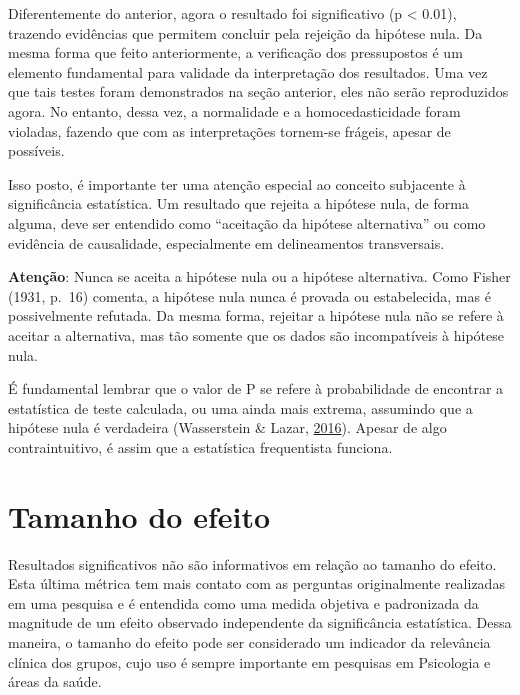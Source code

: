 \documentclass[
]{book}
\begin{document}
Diferentemente do anterior, agora o resultado foi significativo (p
\textless{} 0.01), trazendo evidências que permitem concluir pela
rejeição da hipótese nula. Da mesma forma que feito anteriormente, a
verificação dos pressupostos é um elemento fundamental para validade da
interpretação dos resultados. Uma vez que tais testes foram demonstrados
na seção anterior, eles não serão reproduzidos agora. No entanto, dessa
vez, a normalidade e a homocedasticidade foram violadas, fazendo que com
as interpretações tornem-se frágeis, apesar de possíveis.

Isso posto, é importante ter uma atenção especial ao conceito subjacente
à significância estatística. Um resultado que rejeita a hipótese nula,
de forma alguma, deve ser entendido como ``aceitação da hipótese
alternativa'' ou como evidência de causalidade, especialmente em
delineamentos transversais.

\begin{warning}

\textbf{Atenção}: Nunca se aceita a hipótese nula ou a hipótese
alternativa. Como Fisher (1931, p.~16) comenta, a hipótese nula nunca é
provada ou estabelecida, mas é possivelmente refutada. Da mesma forma,
rejeitar a hipótese nula não se refere à aceitar a alternativa, mas tão
somente que os dados são incompatíveis à hipótese nula.

\end{warning}

É fundamental lembrar que o valor de P se refere à probabilidade de
encontrar a estatística de teste calculada, ou uma ainda mais extrema,
assumindo que a hipótese nula é verdadeira (Wasserstein \& Lazar,
\protect\hyperlink{ref-Wasserstein2016}{2016}). Apesar de algo
contraintuitivo, é assim que a estatística frequentista funciona.

\hypertarget{tamanho-do-efeito-1}{%
\section{Tamanho do efeito}\label{tamanho-do-efeito-1}}

Resultados significativos não são informativos em relação ao tamanho do
efeito. Esta última métrica tem mais contato com as perguntas
originalmente realizadas em uma pesquisa e é entendida como uma medida
objetiva e padronizada da magnitude de um efeito observado independente
da significância estatística. Dessa maneira, o tamanho do efeito pode
ser considerado um indicador da relevância clínica dos grupos, cujo uso
é sempre importante em pesquisas em Psicologia e áreas da saúde.
\end{document}
